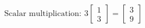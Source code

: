 \documentclass[preview]{standalone}
\begin{document}
\begin{align*}
\text{Scalar multiplication: } 3 \begin{bmatrix} 1 \\ 3 \end{bmatrix} = \begin{bmatrix} 3 \\ 9 \end{bmatrix}
\end{align*}
\end{document}
